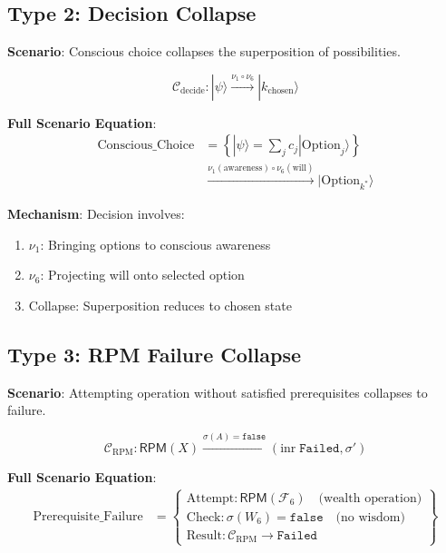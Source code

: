 \documentclass[11pt,twoside]{book}
\newcommand{\noe}[1]{\nu_{#1}}
\newcommand{\Foundations}{\mathcal{F}}
\newcommand{\RPM}{\mathsf{RPM}}
\newcommand{\Failed}{\mathtt{Failed}}
\newcommand{\Collapse}{\mathcal{C}}
\begin{document}
\subsection{Type 2: Decision Collapse}

\textbf{Scenario}: Conscious choice collapses the superposition of possibilities.

\begin{equation}
\boxed{
    \Collapse_{\mathrm{decide}} : |\psi\rangle
    \xrightarrow{\noe{1} \circ \noe{6}} |k_{\mathrm{chosen}}\rangle
}
\end{equation}

\textbf{Full Scenario Equation}:
\begin{align}
    \text{Conscious\_Choice} &= \left\{
    |\psi\rangle = \sum_j c_j |\mathrm{Option}_j\rangle
    \right\} \\
    &\xrightarrow{\noe{1}(\text{awareness}) \circ \noe{6}(\text{will})}
    |\mathrm{Option}_{k^*}\rangle
\end{align}

\textbf{Mechanism}: Decision involves:
\begin{enumerate}
    \item $\noe{1}$: Bringing options to conscious awareness
    \item $\noe{6}$: Projecting will onto selected option
    \item Collapse: Superposition reduces to chosen state
\end{enumerate}

\subsection{Type 3: RPM Failure Collapse}

\textbf{Scenario}: Attempting operation without satisfied prerequisites collapses to failure.

\begin{equation}
\boxed{
    \Collapse_{\mathrm{RPM}} : \RPM(X) \xrightarrow{\sigma(A) = \mathtt{false}}
    (\mathrm{inr}\; \Failed, \sigma')
}
\end{equation}

\textbf{Full Scenario Equation}:
\begin{align}
    \text{Prerequisite\_Failure} &= \left\{
    \begin{array}{l}
        \text{Attempt}: \RPM(\Foundations_6) \quad \text{(wealth operation)} \\
        \text{Check}: \sigma(W_6) = \mathtt{false} \quad \text{(no wisdom)} \\
        \text{Result}: \Collapse_{\mathrm{RPM}} \to \Failed
    \end{array}
    \right\}
\end{align}
\end{document}
